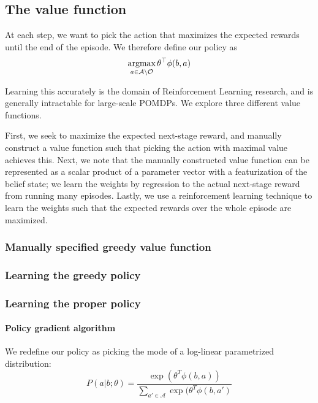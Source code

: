 \documentclass[runningheads]{llncs}
\begin{document}

\subsection{The value function} \label{sec:value}
At each step, we want to pick the action that maximizes the expected rewards until the end of the episode.
We therefore define our policy as
\begin{equation}
\argmax_{a \in \mathcal{A} \setminus \mathcal{O}} \theta^\top \phi(b,a)
\end{equation}


Learning this accurately is the domain of Reinforcement Learning research, and is generally intractable for large-scale POMDPs.
We explore three different value functions.

First, we seek to maximize the expected next-stage reward, and manually construct a value function such that picking the action with maximal value achieves this.
Next, we note that the manually constructed value function can be represented as a scalar product of a parameter vector with a featurization of the belief state; we learn the weights by regression to the actual next-stage reward from running many episodes.
Lastly, we use a reinforcement learning technique to learn the weights such that the expected rewards over the whole episode are maximized.

\subsubsection{Manually specified greedy value function}

\subsubsection{Learning the greedy policy}


\subsubsection{Learning the proper policy}

\paragraph{Policy gradient algorithm}
We redefine our policy as picking the mode of a log-linear parametrized distribution:
\begin{equation}
P(a|b;\theta) = \frac{\exp(\theta^T \phi(b,a))}{\sum_{a' \in \mathcal{A}} \exp(\theta^T \phi(b,a')}
\end{equation}
\end{document}
